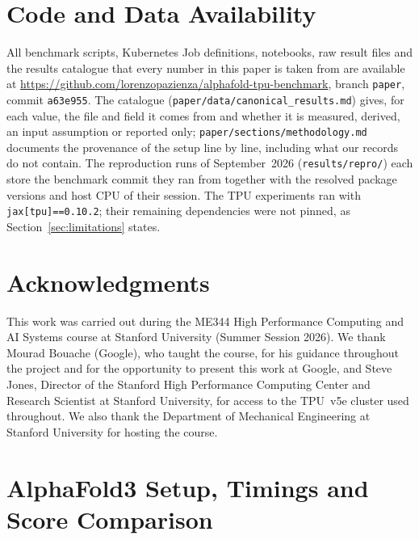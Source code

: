 \documentclass{article}
\begin{document}
\section*{Code and Data Availability}
All benchmark scripts, Kubernetes Job definitions, notebooks, raw result
files and the results catalogue that every number in this paper is taken
from are available at
\url{https://github.com/lorenzopazienza/alphafold-tpu-benchmark}, branch
\texttt{paper}, commit \texttt{a63e955}. The catalogue
(\texttt{paper/data/canonical\_results.md}) gives, for each value, the
file and field it comes from and whether it is measured, derived, an
input assumption or reported only; \texttt{paper/sections/methodology.md} documents the
provenance of the setup line by line, including what our records do not
contain. The reproduction runs of September~2026
(\texttt{results/repro/}) each store the benchmark commit they ran from
together with the resolved package versions and host CPU of their
session. The TPU experiments ran with \texttt{jax[tpu]==0.10.2};
their remaining dependencies were not pinned, as
Section~\ref{sec:limitations} states.

\section*{Acknowledgments}
This work was carried out during the ME344 High Performance Computing
and AI Systems course at Stanford University (Summer Session 2026). We
thank Mourad Bouache (Google), who taught the course, for his guidance
throughout the project and for the opportunity to present this work at
Google, and Steve Jones, Director of the Stanford High
Performance Computing Center and Research Scientist at Stanford
University, for access to the TPU~v5e cluster used throughout. We also
thank the Department of Mechanical Engineering at Stanford University
for hosting the course.




\appendix
\section{AlphaFold3 Setup, Timings and Score Comparison}\label{app:af3}

\end{document}
